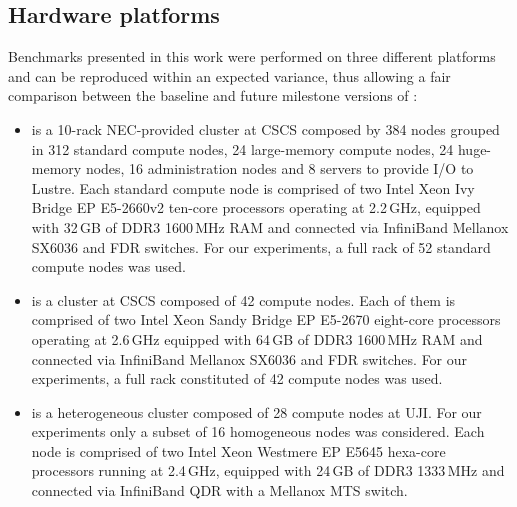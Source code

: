 \subsection{Hardware platforms}
\label{subsec:3.1}

Benchmarks presented  in this work  were performed on  three different
platforms  and can  be reproduced  within an  expected  variance, thus
allowing a  fair comparison between the baseline  and future milestone
versions of \cosmoart:

\begin{itemize}
\item \monch is  a 10-rack NEC-provided clus\-ter at  CSCS composed by
  384   nodes  grouped  in  312  standard  compute  nodes,  24
  large-memory compute nodes,  24 huge-memory nodes, 16 administration
  nodes and 8 servers to provide I/O to Lustre.
Each standard  compute node  is comprised of  two Intel Xeon Ivy Bridge EP
E5-2660v2  ten-core processors  operating at  2.2\,GHz,  equipped with
32\,GB  of DDR3 1600\,MHz  RAM and  connected via  InfiniBand Mellanox
SX6036 and FDR switches.  For our experiments, a full rack  of 52 standard compute nodes was used. %

\item \pilat is a cluster at CSCS composed of 42 compute nodes.  
  Each of them is comprised of two Intel Xeon Sandy Bridge EP E5-2670 eight-core processors operating
  at 2.6\,GHz equipped with 64\,GB of DDR3 1600\,MHz RAM and connected
  via  InfiniBand   Mellanox  SX6036   and  FDR  switches.    For  our
  experiments, a full rack constituted of 42 compute  nodes was used.

\item \tinto is  a heterogeneous cluster composed of  28 compute nodes
  at UJI.  For  our experiments only a subset  of 16 homogeneous nodes
  was considered. Each node is comprised of two Intel Xeon Westmere EP
  E5645 hexa-core processors running at 2.4\,GHz, equipped with 24\,GB
  of DDR3 1333\,MHz  and connected via InfiniBand QDR  with a Mellanox
  MTS switch.
\end{itemize}

